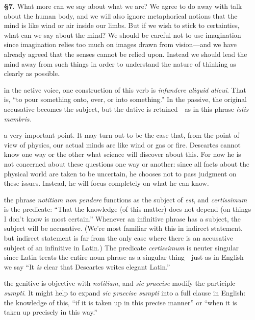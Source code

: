 \prenotes

\textbf{§7.} What more can we say about what we are? We agree to do away with talk about the human body, and we will also ignore metaphorical notions that the mind is like wind or air inside our limbs. But if we wish to stick to certainties, what can we say about the mind? We should be careful not to use imagination since imagination relies too much on images drawn from vision---and we have already agreed that the senses cannot be relied upon. Instead we should lead the mind away from such things in order to understand the nature of thinking as clearly as possible.

 in the active voice, one construction of this verb is \textit{infundere aliquid alicui}. That is, ``to pour something onto, over, or into something.'' In the passive, the original accusative becomes the subject, but the dative is retained---as in this phrase \textit{istis membris}.

 a very important point. It may turn out to be the case that, from the point of view of physics, our actual minds are like wind or gas or fire. Descartes cannot know one way or the other what science will discover about this. For now he is not concerned about these questions one way or another: since all facts about the physical world are taken to be uncertain, he chooses not to pass judgment on these issues. Instead, he will focus completely on what he can know.

 the phrase \textit{notitiam non pendere} functions as the subject of \textit{est}, and \textit{certissimum} is the predicate: ``That the knowledge (of this matter) does not depend (on things I don't know is most certain.'' Whenever an infinitive phrase has a subject, the subject will be accusative. (We're most familiar with this in indirect statement, but indirect statement is far from the only case where there is an accusative subject of an infinitive in Latin.) The predicate \textit{certissimum} is neuter singular since Latin treats the entire noun phrase as a singular thing---just as in English we say ``It \textit{is} clear that Descartes writes elegant Latin.''

 the genitive is objective with \textit{notitiam}, and \textit{sic praecise} modify the participle \textit{sumpti}. It might help to expand \textit{sic praecise sumpti} into a full clause in English: the knowledge of this, ``if it is taken up in this precise manner'' or ``when it is taken up precisely in this way.''

